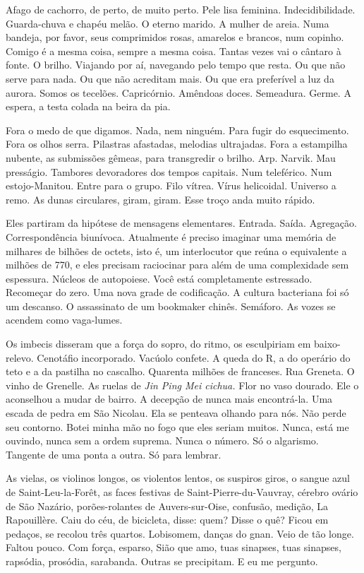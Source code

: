 Afago de cachorro, de perto, de muito perto. Pele lisa feminina.
Indecidibilidade. Guarda-chuva e chapéu melão. O eterno marido. A mulher
de areia. Numa bandeja, por favor, seus comprimidos rosas, amarelos e
brancos, num copinho. Comigo é a mesma coisa, sempre a mesma coisa.
Tantas vezes vai o cântaro à fonte. O brilho. Viajando por aí, navegando
pelo tempo que resta. Ou que não serve para nada. Ou que não acreditam
mais. Ou que era preferível a luz da aurora. Somos os tecelões.
Capricórnio. Amêndoas doces. Semeadura. Germe. A espera, a testa colada
na beira da pia.

Fora o medo de que digamos. Nada, nem ninguém. Para fugir do
esquecimento. Fora os olhos serra. Pilastras afastadas, melodias
ultrajadas. Fora a estampilha nubente, as submissões gêmeas, para
transgredir o brilho. Arp. Narvik. Mau presságio. Tambores devoradores
dos tempos capitais. Num teleférico. Num estojo-Manitou. Entre para o
grupo. Filo vítrea. Vírus helicoidal. Universo a remo. As dunas
circulares, giram, giram. Esse troço anda muito rápido.

Eles partiram da hipótese de mensagens elementares. Entrada. Saída.
Agregação. Correspondência biunívoca. Atualmente é preciso imaginar uma
memória de milhares de bilhões de octets, isto é, um interlocutor que
reúna o equivalente a milhões de  770, e eles precisam raciocinar
para além de uma complexidade sem espessura. Núcleos de autopoiese. Você
está completamente estressado. Recomeçar do zero. Uma nova grade de
codificação. A cultura bacteriana foi só um descanso. O assassinato de
um bookmaker chinês. Semáforo. As vozes se acendem como vaga-lumes.

Os imbecis disseram que a força do sopro, do ritmo, os esculpiriam em
baixo-relevo. Cenotáfio incorporado. Vacúolo confete. A queda do R, a do
operário do teto e a da pastilha no cascalho. Quarenta milhões de
franceses. Rua Greneta. O vinho de Grenelle. As ruelas de \emph{Jin Ping
Mei cichua.} Flor no vaso dourado. Ele o aconselhou a mudar de bairro. A
decepção de nunca mais encontrá-la. Uma escada de pedra em São Nicolau.
Ela se penteava olhando para nós. Não perde seu contorno. Botei minha
mão no fogo que eles seriam muitos. Nunca, está me ouvindo, nunca sem a
ordem suprema. Nunca o número. Só o algarismo. Tangente de uma ponta a
outra. Só para lembrar.

As vielas, os violinos longos, os violentos lentos, os suspiros giros, o
sangue azul de Saint-Leu-la-Forêt, as faces festivas de
Saint-Pierre-du-Vauvray, cérebro ovário de São Nazário, porões-rolantes
de Auvers-sur-Oise, confusão, medição, La Rapouillère. Caiu do céu, de
bicicleta, disse: quem? Disse o quê? Ficou em pedaços, se recolou três
quartos. Lobisomem, danças do gnan. Veio de tão longe. Faltou pouco. Com
força, esparso, Sião que amo, tuas sinapses, tuas sinapses, rapsódia,
prosódia, sarabanda. Outras se precipitam. E eu me pergunto.

